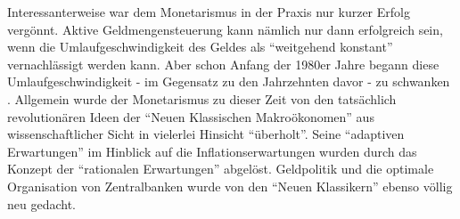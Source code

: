 Interessanterweise war dem Monetarismus in der Praxis nur kurzer Erfolg vergönnt. Aktive Geldmengensteuerung kann nämlich nur dann erfolgreich sein, wenn die Umlaufgeschwindigkeit des Geldes als "`weitgehend konstant"' vernachlässigt werden kann. Aber schon Anfang der 1980er Jahre begann diese Umlaufgeschwindigkeit - im Gegensatz zu den Jahrzehnten davor - zu schwanken \parencite[S. 703]{Samuelson1998}. Allgemein wurde der Monetarismus zu dieser Zeit von den tatsächlich revolutionären Ideen der "`Neuen Klassischen Makroökonomen"' aus wissenschaftlicher Sicht in vielerlei Hinsicht "`überholt"'. Seine "`adaptiven Erwartungen"' im Hinblick auf die Inflationserwartungen wurden durch das Konzept der "`rationalen Erwartungen"' abgelöst. Geldpolitik und die optimale Organisation von Zentralbanken wurde von den "`Neuen Klassikern"' ebenso völlig neu gedacht. 

